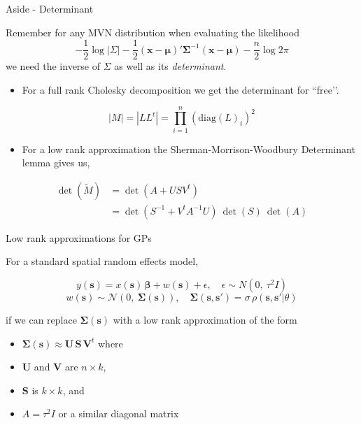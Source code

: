 \documentclass[11pt,ignorenonframetext,]{beamer}
\providecommand{\tightlist}{%
  \setlength{\itemsep}{0pt}\setlength{\parskip}{0pt}}
\begin{document}
\begin{frame}{Aside - Determinant}
\protect\hypertarget{aside---determinant}{}

Remember for any MVN distribution when evaluating the likelihood
\[ -\frac{1}{2} \log {|\Sigma|} - \frac{1}{2} (\symbf{x}-\symbf{\mu})' {\symbf{\Sigma}^{-1}} (\symbf{x}-\symbf{\mu}) - \frac{n}{2}\log 2\pi\]
we need the inverse of \(\Sigma\) as well as its \emph{determinant}.

\pause

\begin{itemize}
\tightlist
\item
  For a full rank Cholesky decomposition we get the determinant for
  ``free’’.
\end{itemize}

\vspace{-3mm}

\[|M| = |LL^t| = \prod_{i=1}^n \left(\text{diag}(L)_i\right)^2\]

\pause

\begin{itemize}
\tightlist
\item
  For a low rank approximation the Sherman-Morrison-Woodbury Determinant
  lemma gives us,
\end{itemize}

\vspace{-3mm}

\[\begin{aligned}
\det(\tilde M) 
  &= \det({A} + {U} {S} {V^t}) \\
  &= \det(S^{-1} + V^t A^{-1} U) ~ \det(S) ~ \det(A)
\end{aligned}\]

\end{frame}

\begin{frame}[t]{Low rank approximations for GPs}
\protect\hypertarget{low-rank-approximations-for-gps}{}

For a standard spatial random effects model,

\[ y(\symbf{s}) = x(\symbf{s}) \, \symbf{\beta} + w(\symbf{s}) + \epsilon, \quad \epsilon \sim N(0,~\tau^2 I) \]
\[ w(\symbf{s}) \sim \mathcal{N}(0,~\symbf{\Sigma}(\symbf{s})), \quad \symbf{\Sigma}(\symbf{s},\symbf{s}')=\sigma\,\rho(\symbf{s},\symbf{s}'|\theta) \]

if we can replace \(\symbf{\Sigma}(\symbf{s})\) with a low rank
approximation of the form

\begin{itemize}
\item
  \(\symbf{\Sigma}(\symbf{s}) \approx \symbf{U}\,\symbf{S}\,\symbf{V}^t\)
  where
\item
  \(\symbf{U}\) and \(\symbf{V}\) are \(n \times k\),
\item
  \(\symbf{S}\) is \(k \times k\), and
\item
  \(A = \tau^2 I\) or a similar diagonal matrix
\end{itemize}

\end{frame}
\end{document}
